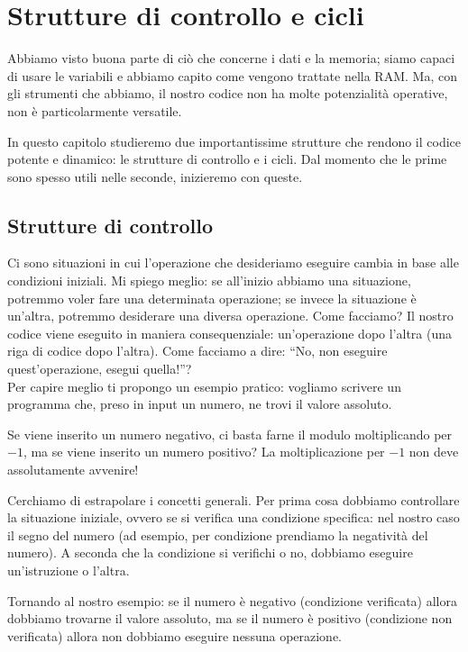 
\chapter{Strutture di controllo e cicli}\label{cicli}	
Abbiamo visto buona parte di ciò che concerne i dati e la memoria; siamo capaci di usare le variabili e abbiamo capito come vengono trattate nella RAM. Ma, con gli strumenti che abbiamo, il nostro codice non ha molte potenzialità operative, non è particolarmente versatile. 
	
In questo capitolo studieremo due importantissime strutture che rendono il codice potente e dinamico: le strutture di controllo e i cicli. Dal momento che le prime sono spesso utili nelle seconde, inizieremo con queste.
\section{Strutture di controllo}
Ci sono situazioni in cui l'operazione che desideriamo eseguire cambia in base alle condizioni iniziali. Mi spiego meglio: se all'inizio abbiamo una situazione, potremmo voler fare una determinata operazione; se invece la situazione è un'altra, potremmo desiderare una diversa operazione. Come facciamo? Il nostro codice viene eseguito in maniera consequenziale: un'operazione dopo l'altra (una riga di codice dopo l'altra). Come facciamo a dire: ``No, non eseguire quest'operazione, esegui quella!''?\\
	
Per capire meglio ti propongo un esempio pratico: vogliamo scrivere un programma che, preso in input un numero, ne trovi il valore assoluto. 
	
Se viene inserito un numero negativo, ci basta farne il modulo moltiplicando per $-1$, ma se viene inserito un numero positivo? La moltiplicazione per $-1$ non deve assolutamente avvenire!
	
Cerchiamo di estrapolare i concetti generali. Per prima cosa dobbiamo controllare la situazione iniziale, ovvero se si verifica una condizione specifica: nel nostro caso il segno del numero (ad esempio, per condizione prendiamo la negatività del numero). A seconda che la condizione si verifichi o no, dobbiamo eseguire un'istruzione o l'altra.
	
Tornando al nostro esempio: se il numero è negativo (condizione verificata) allora dobbiamo trovarne il valore assoluto, ma se il numero è positivo (condizione non verificata) allora non dobbiamo eseguire nessuna operazione.\\
	
